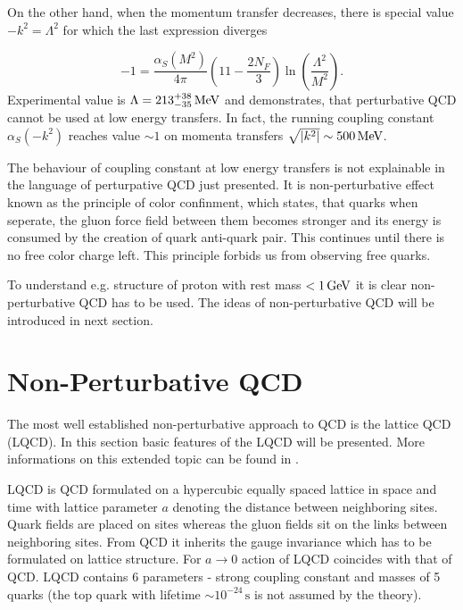 On the other hand, when the momentum transfer decreases, there is special value
$-k^2=\Lambda^2$ for which the last expression diverges

\begin{equation}
  -1 = \frac{\alpha_S(M^2)}{4\pi} \left( 11 - \frac{2N_F}{3} \right)
  \ln \left( \frac{\Lambda^2}{M^2} \right).
  \label{eq:RunningLambda}
\end{equation}
Experimental value is $\Lambda=213^{+38}_{-35}\,\text{MeV}$ \cite{wiki:QCDHistory} and demonstrates, that
perturbative QCD cannot be used at low energy transfers. In fact, the running
coupling constant $\alpha_S(-k^2)$ reaches value $\sim 1$ on momenta
transfers $\sqrt{\left| k^2 \right|} \sim 500\,\text{MeV}$. 

The behaviour of coupling constant at low energy transfers is not explainable in
the language of perturpative QCD just presented. It is non-perturbative effect
known as the principle of color confinment, which states, that quarks when
seperate, the gluon force field between them becomes stronger and its energy is
consumed by the creation of quark anti-quark pair. This continues until there is
no free color charge left. This principle forbids us from observing free quarks.

To understand e.g. structure of proton with rest mass $< 1\,\text{GeV}$ it is clear
non-perturbative QCD has to be used. The ideas of non-perturbative QCD will be
introduced in next section. 

\section{Non-Perturbative QCD}

The most well established non-perturbative approach to QCD is the lattice QCD
(LQCD). In this section basic features of the LQCD will be presented.  More
informations on this extended topic can be found in \cite{QCDTextbook,LQCDIntro}.

LQCD is QCD formulated on a hypercubic equally spaced lattice in space and time
with lattice parameter $a$ denoting the distance between neighboring sites.
Quark fields are placed on sites whereas the gluon fields sit on the links
between neighboring sites. From QCD it inherits the gauge invariance which has
to be formulated on lattice structure.  For $a \rightarrow 0$ action of LQCD
coincides with that of QCD. LQCD contains 6 parameters - strong coupling
constant and masses of 5 quarks (the top quark with lifetime $ \sim
10^{-24}\,\text{s}$ is not assumed by the theory).

